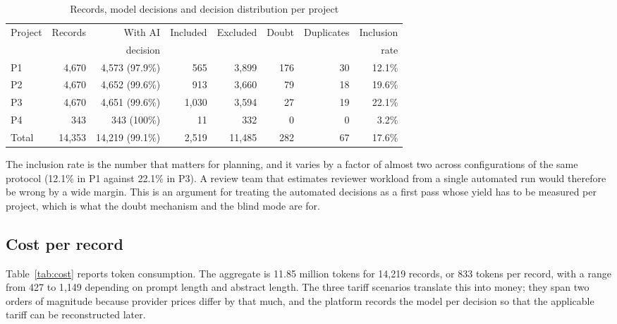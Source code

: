 \begin{table}[htbp]
\centering
\caption{Records, model decisions and decision distribution per project}
\label{tab:corpus}
\begin{tabular}{@{}lrrrrrrr@{}}
\toprule
Project & Records & With AI & Included & Excluded & Doubt & Duplicates & Inclusion \\
 & & decision & & & & & rate \\
\midrule
P1 & 4{,}670 & 4{,}573 (97.9\%) & 565 & 3{,}899 & 176 & 30 & 12.1\% \\
P2 & 4{,}670 & 4{,}652 (99.6\%) & 913 & 3{,}660 & 79 & 18 & 19.6\% \\
P3 & 4{,}670 & 4{,}651 (99.6\%) & 1{,}030 & 3{,}594 & 27 & 19 & 22.1\% \\
P4 & 343 & 343 (100\%) & 11 & 332 & 0 & 0 & 3.2\% \\
\midrule
Total & 14{,}353 & 14{,}219 (99.1\%) & 2{,}519 & 11{,}485 & 282 & 67 & 17.6\% \\
\bottomrule
\end{tabular}
\end{table}

The inclusion rate is the number that matters for planning, and it varies by a
factor of almost two across configurations of the same protocol (12.1\% in P1
against 22.1\% in P3). A review team that estimates reviewer workload from a
single automated run would therefore be wrong by a wide margin. This is an
argument for treating the automated decisions as a first pass whose yield has
to be measured per project, which is what the doubt mechanism and the blind
mode are for.

\subsection{Cost per record}

Table~\ref{tab:cost} reports token consumption. The aggregate is 11.85 million
tokens for 14{,}219 records, or 833 tokens per record, with a range from 427 to
1{,}149 depending on prompt length and abstract length. The three tariff
scenarios translate this into money; they span two orders of magnitude because
provider prices differ by that much, and the platform records the model per
decision so that the applicable tariff can be reconstructed later.

